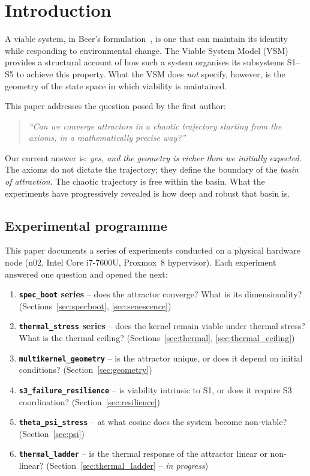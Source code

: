 \documentclass[11pt, a4paper]{article}
\begin{document}
\tableofcontents
\newpage


\section{Introduction}
\label{sec:intro}

A viable system, in Beer's formulation~\cite{beer1972brain}, is one that
can maintain its identity while responding to environmental change.
The Viable System Model (VSM) provides a structural account of how such
a system organises its subsystems S1--S5 to achieve this property.
What the VSM does \emph{not} specify, however, is the geometry of the
state space in which viability is maintained.

This paper addresses the question posed by the first author:
\begin{quote}
\textit{``Can we converge attractors in a chaotic trajectory starting from
the axioms, in a mathematically precise way?''}
\end{quote}
Our current answer is: \emph{yes, and the geometry is richer than we
initially expected.}
The axioms do not dictate the trajectory; they define the boundary of the
\emph{basin of attraction}.
The chaotic trajectory is free within the basin.
What the experiments have progressively revealed is how deep and robust
that basin is.

\subsection{Experimental programme}

This paper documents a series of experiments conducted on a physical
hardware node (n02, Intel Core i7-7600U, Proxmox~8 hypervisor).
Each experiment answered one question and opened the next:

\begin{enumerate}
  \item \textbf{\texttt{spec\_boot} series} -- does the attractor converge?
        What is its dimensionality?
        (Sections~\ref{sec:specboot}, \ref{sec:senescence})
  \item \textbf{\texttt{thermal\_stress} series} -- does the kernel remain
        viable under thermal stress?
        What is the thermal ceiling?
        (Sections~\ref{sec:thermal}, \ref{sec:thermal_ceiling})
  \item \textbf{\texttt{multikernel\_geometry}} -- is the attractor unique,
        or does it depend on initial conditions?
        (Section~\ref{sec:geometry})
  \item \textbf{\texttt{s3\_failure\_resilience}} -- is viability intrinsic
        to S1, or does it require S3 coordination?
        (Section~\ref{sec:resilience})
  \item \textbf{\texttt{theta\_psi\_stress}} -- at what cosine does the
        system become non-viable?
        (Section~\ref{sec:psi})
  \item \textbf{\texttt{thermal\_ladder}} -- is the thermal response of
        the attractor linear or non-linear?
        (Section~\ref{sec:thermal_ladder} -- \textit{in progress})
\end{enumerate}
\end{document}
